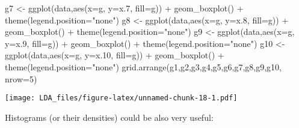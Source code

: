 \documentclass[
]{article}
\newenvironment{Shaded}{\begin{snugshade}}{\end{snugshade}}
\newcommand{\AttributeTok}[1]{\textcolor[rgb]{0.77,0.63,0.00}{#1}}
\newcommand{\DecValTok}[1]{\textcolor[rgb]{0.00,0.00,0.81}{#1}}
\newcommand{\FloatTok}[1]{\textcolor[rgb]{0.00,0.00,0.81}{#1}}
\newcommand{\FunctionTok}[1]{\textcolor[rgb]{0.00,0.00,0.00}{#1}}
\newcommand{\NormalTok}[1]{#1}
\newcommand{\OtherTok}[1]{\textcolor[rgb]{0.56,0.35,0.01}{#1}}
\newcommand{\SpecialCharTok}[1]{\textcolor[rgb]{0.00,0.00,0.00}{#1}}
\newcommand{\StringTok}[1]{\textcolor[rgb]{0.31,0.60,0.02}{#1}}
\begin{document}
\begin{Shaded}
\begin{Highlighting}[]
\NormalTok{g7 }\OtherTok{\textless{}{-}} \FunctionTok{ggplot}\NormalTok{(data,}\FunctionTok{aes}\NormalTok{(}\AttributeTok{x=}\NormalTok{g, }\AttributeTok{y=}\NormalTok{x}\FloatTok{.7}\NormalTok{, }\AttributeTok{fill=}\NormalTok{g)) }\SpecialCharTok{+} 
    \FunctionTok{geom\_boxplot}\NormalTok{() }\SpecialCharTok{+}
    \FunctionTok{theme}\NormalTok{(}\AttributeTok{legend.position=}\StringTok{"none"}\NormalTok{)}
\NormalTok{g8 }\OtherTok{\textless{}{-}} \FunctionTok{ggplot}\NormalTok{(data,}\FunctionTok{aes}\NormalTok{(}\AttributeTok{x=}\NormalTok{g, }\AttributeTok{y=}\NormalTok{x}\FloatTok{.8}\NormalTok{, }\AttributeTok{fill=}\NormalTok{g)) }\SpecialCharTok{+} 
    \FunctionTok{geom\_boxplot}\NormalTok{() }\SpecialCharTok{+}
    \FunctionTok{theme}\NormalTok{(}\AttributeTok{legend.position=}\StringTok{"none"}\NormalTok{)}
\NormalTok{g9 }\OtherTok{\textless{}{-}} \FunctionTok{ggplot}\NormalTok{(data,}\FunctionTok{aes}\NormalTok{(}\AttributeTok{x=}\NormalTok{g, }\AttributeTok{y=}\NormalTok{x}\FloatTok{.9}\NormalTok{, }\AttributeTok{fill=}\NormalTok{g)) }\SpecialCharTok{+} 
    \FunctionTok{geom\_boxplot}\NormalTok{() }\SpecialCharTok{+}
    \FunctionTok{theme}\NormalTok{(}\AttributeTok{legend.position=}\StringTok{"none"}\NormalTok{)}
\NormalTok{g10 }\OtherTok{\textless{}{-}} \FunctionTok{ggplot}\NormalTok{(data,}\FunctionTok{aes}\NormalTok{(}\AttributeTok{x=}\NormalTok{g, }\AttributeTok{y=}\NormalTok{x}\FloatTok{.10}\NormalTok{, }\AttributeTok{fill=}\NormalTok{g)) }\SpecialCharTok{+} 
    \FunctionTok{geom\_boxplot}\NormalTok{() }\SpecialCharTok{+}
    \FunctionTok{theme}\NormalTok{(}\AttributeTok{legend.position=}\StringTok{"none"}\NormalTok{)}
\FunctionTok{grid.arrange}\NormalTok{(g1,g2,g3,g4,g5,g6,g7,g8,g9,g10, }\AttributeTok{nrow=}\DecValTok{5}\NormalTok{)}
\end{Highlighting}
\end{Shaded}

\texttt{[image: LDA\_files/figure-latex/unnamed-chunk-18-1.pdf]}

Histograms (or their densities) could be also very useful:
\end{document}
